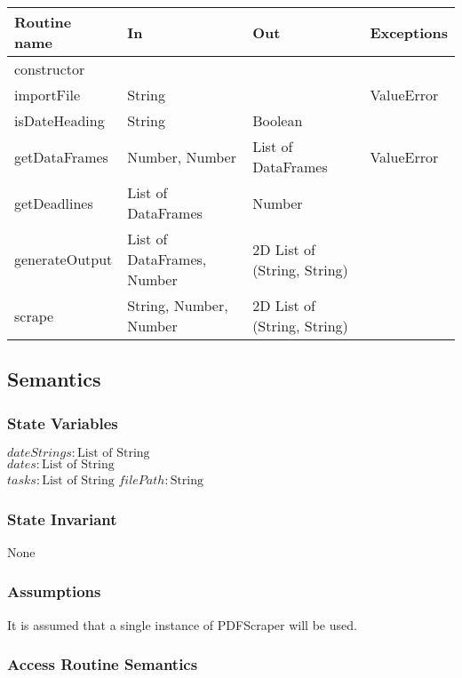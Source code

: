 \documentclass[12pt, titlepage]{article}
\begin{document}
\begin{center}
\begin{tabular}{| l | l | l | l |}
  \hline
  \textbf{Routine name} & \textbf{In} & \textbf{Out} & \textbf{Exceptions}\\
  \hline
  constructor & ~ & ~ & ~\\
  \hline
  importFile & String & ~ & ValueError\\
  \hline
  isDateHeading & String & Boolean & ~\\
  \hline
  getDataFrames & Number, Number & List of DataFrames & ValueError\\
  \hline
  getDeadlines & List of DataFrames & Number & ~\\
  \hline
  generateOutput & List of DataFrames, Number & 2D List of (String, String) & ~\\
  \hline
  scrape & String, Number, Number & 2D List of (String, String) & ~\\
  \hline
\end{tabular}
\end{center}

\subsection{Semantics}

\subsubsection{State Variables}

$\mathit{dateStrings}: \text{List of String}$\\
$\mathit{dates}: \text{List of String}$\\
$\mathit{tasks}: \text{List of String}$
$\mathit{filePath}: \text{String}$

\subsubsection{State Invariant}

None

\subsubsection{Assumptions}

It is assumed that a single instance of PDFScraper will be used.

\subsubsection{Access Routine Semantics}
\end{document}
